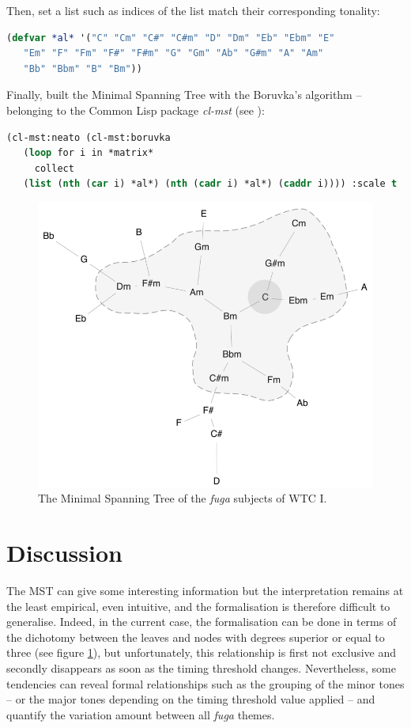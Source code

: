 Then, set a list such as indices of the list match their corresponding tonality:
\begin{lstlisting}[language=Lisp]
(defvar *al* '("C" "Cm" "C#" "C#m" "D" "Dm" "Eb" "Ebm" "E" 
   "Em" "F" "Fm" "F#" "F#m" "G" "Gm" "Ab" "G#m" "A" "Am" 
   "Bb" "Bbm" "B" "Bm"))
\end{lstlisting}

Finally, built the Minimal Spanning Tree with the Boruvka's algorithm -- belonging to the Common Lisp package \textsl{cl-mst} (see ): 

\begin{lstlisting}[language=Lisp]
(cl-mst:neato (cl-mst:boruvka 
   (loop for i in *matrix* 
     collect 
   (list (nth (car i) *al*) (nth (cadr i) *al*) (caddr i)))) :scale t :len t)
\end{lstlisting}

\begin{figure}[!hbt]
	\begin{center}
		\includegraphics[scale=3]{img/8801}
		\caption{The Minimal Spanning Tree of the \textit{fuga} subjects of WTC I.}
		\label{fig:mstcor}
	\end{center}
\end{figure}

\section{Discussion}

The MST can give some interesting information but the interpretation remains at the least empirical, even intuitive, and the formalisation is therefore difficult to generalise. Indeed, in the current case, the formalisation can be done in terms of the dichotomy between the leaves and nodes with degrees superior or equal to three (see figure \ref{fig:mstcor}), but unfortunately, this relationship is first not exclusive and secondly disappears as soon as the timing threshold changes. Nevertheless, some tendencies can reveal formal relationships such as the grouping of the minor tones -- or the major tones depending on the timing threshold value applied -- and quantify the variation amount between all \textit{fuga} themes.


